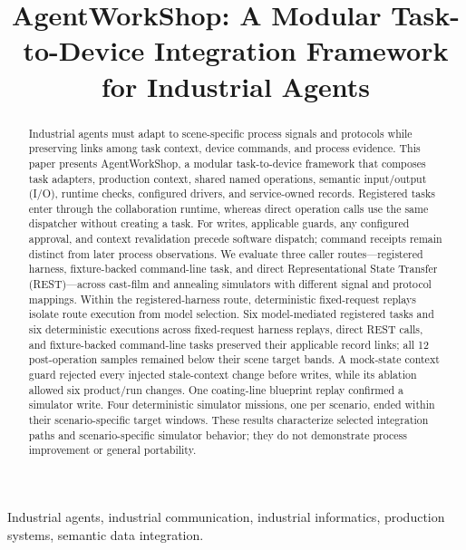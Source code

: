 \documentclass[journal]{IEEEtran}
\begin{document}

\title{AgentWorkShop: A Modular Task-to-Device Integration Framework for Industrial Agents}

\author{}

\maketitle

\begin{abstract}
Industrial agents must adapt to scene-specific process signals and protocols
while preserving links among task context, device commands, and process
evidence. This paper presents AgentWorkShop, a modular task-to-device framework
that composes task adapters, production context, shared named operations,
semantic input/output (I/O), runtime checks, configured drivers, and
service-owned records.
Registered tasks enter through the collaboration runtime, whereas direct
operation calls use the same dispatcher without creating a task. For writes,
applicable guards, any configured approval, and context revalidation precede
software dispatch; command receipts remain distinct from later process
observations.
We evaluate three caller routes---registered harness, fixture-backed
command-line task, and direct Representational State Transfer (REST)---across
cast-film and annealing simulators with different signal and protocol
mappings. Within the registered-harness route, deterministic fixed-request
replays isolate route execution from model selection. Six model-mediated
registered tasks and six deterministic executions across fixed-request
harness replays, direct REST calls, and fixture-backed command-line tasks
preserved their applicable record links; all 12 post-operation samples remained below their
scene target bands. A mock-state context guard rejected every injected
stale-context change before writes, while its ablation allowed six product/run
changes. One coating-line blueprint replay confirmed a simulator write. Four
deterministic simulator missions, one per scenario, ended within their
scenario-specific target windows. These results characterize selected
integration paths and scenario-specific simulator behavior; they do not
demonstrate process improvement or general portability.
\end{abstract}

\begin{IEEEkeywords}
Industrial agents, industrial communication, industrial informatics,
production systems, semantic data integration.
\end{IEEEkeywords}

\IEEEpeerreviewmaketitle










\end{document}
